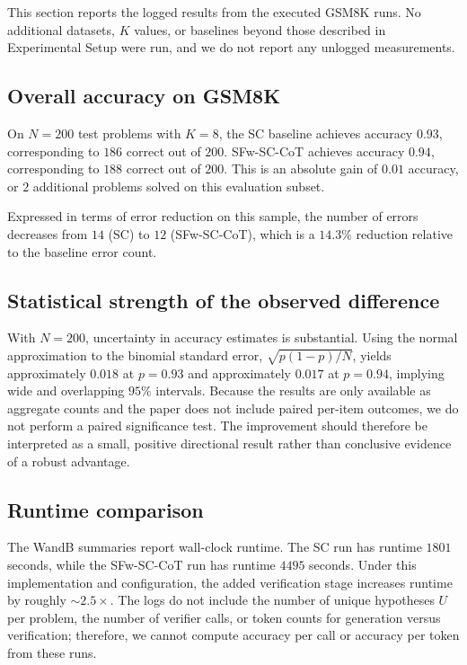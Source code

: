\documentclass[journal,article,accept,pdftex,moreauthors]{Definitions/mdpi}
\begin{document}
This section reports the logged results from the executed GSM8K runs. No additional datasets, $K$ values, or baselines beyond those described in Experimental Setup were run, and we do not report any unlogged measurements.

\subsection{Overall accuracy on GSM8K}
On $N = 200$ test problems with $K = 8$, the SC baseline achieves accuracy $0.93$, corresponding to $186$ correct out of $200$. SFw-SC-CoT achieves accuracy $0.94$, corresponding to $188$ correct out of $200$. This is an absolute gain of $0.01$ accuracy, or $2$ additional problems solved on this evaluation subset.

Expressed in terms of error reduction on this sample, the number of errors decreases from $14$ (SC) to $12$ (SFw-SC-CoT), which is a $14.3\%$ reduction relative to the baseline error count.

\subsection{Statistical strength of the observed difference}
With $N = 200$, uncertainty in accuracy estimates is substantial. Using the normal approximation to the binomial standard error, $\sqrt{p(1-p)/N}$, yields approximately $0.018$ at $p = 0.93$ and approximately $0.017$ at $p = 0.94$, implying wide and overlapping $95\%$ intervals. Because the results are only available as aggregate counts and the paper does not include paired per-item outcomes, we do not perform a paired significance test. The improvement should therefore be interpreted as a small, positive directional result rather than conclusive evidence of a robust advantage.

\subsection{Runtime comparison}
The WandB summaries report wall-clock runtime. The SC run has runtime $1801$ seconds, while the SFw-SC-CoT run has runtime $4495$ seconds. Under this implementation and configuration, the added verification stage increases runtime by roughly $\sim 2.5\times$. The logs do not include the number of unique hypotheses $U$ per problem, the number of verifier calls, or token counts for generation versus verification; therefore, we cannot compute accuracy per call or accuracy per token from these runs.
\end{document}
